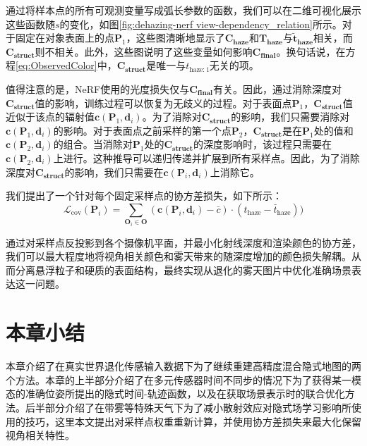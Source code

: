 通过将样本点的所有可观测变量写成弧长参数的函数，我们可以在二维可视化展示这些函数随$s$的变化，如图\ref{fig:dehazing-nerf view-dependency_relation}所示。对于固定在对象表面上的点$\mathbf{P}_1$，这些图清晰地显示了$\mathbf{C_\text{haze}}$和$\mathbf{T_\text{haze}}$与$\mathbf{\tilde{t}_\text{haze}}$相关，而$\mathbf{C_\text{struct}}$则不相关。此外，这些图说明了这些变量如何影响$\mathbf{C_\text{final}}$。换句话说，在方程\ref{eq:ObservedColor}中，$\mathbf{C_\text{struct}}$是唯一与${t}_\text{haze: i}$无关的项。

值得注意的是，NeRF使用的光度损失仅与$\mathbf{C_\text{final}}$有关。因此，通过消除深度对$\mathbf{C_\text{struct}}$值的影响，训练过程可以恢复为无歧义的过程。对于表面点$\mathbf{P}_1$，$\mathbf{C_\text{struct}}$值近似于该点的辐射值$\mathbf{c}(\mathbf{P}_1, \mathbf{d}_i)$。为了消除对$\mathbf{C_\text{struct}}$的影响，我们只需要消除对$\mathbf{c}(\mathbf{P}_1, \mathbf{d}_i)$的影响。对于表面点之前采样的第一个点$\mathbf{P}_2$，$\mathbf{C_\text{struct}}$是在$\mathbf{P}_1$处的值和$\mathbf{c}(\mathbf{P}_2, \mathbf{d}_i)$的组合。当消除对$\mathbf{P}_1$处的$\mathbf{C_\text{struct}}$的深度影响时，该过程只需要在$\mathbf{c}(\mathbf{P}_2, \mathbf{d}_i)$上进行。这种推导可以递归传递并扩展到所有采样点。因此，为了消除深度对$\mathbf{C_\text{struct}}$的影响，我们只需要在$\mathbf{c}(\mathbf{P}_i, \mathbf{d}_i)$上消除它。

我们提出了一个针对每个固定采样点的协方差损失，如下所示：
\begin{equation}
    \mathcal L_\text{cov}(\mathbf{P}_i) = \sum_{\mathbf{O}_i \in \mathbf{O}}(\mathbf{c}(\mathbf{P}_i, \mathbf{d}_i)-\bar{c})\cdot ({t}_\text{haze} - {\bar{t}}_\text{haze}))
\end{equation}

通过对采样点反投影到各个摄像机平面，并最小化射线深度和渲染颜色的协方差，我们可以最大程度地将视角相关颜色和雾天带来的随深度增加的颜色损失解耦。从而分离悬浮粒子和硬质的表面结构，最终实现从退化的雾天图片中优化准确场景表达这一问题。

\section{本章小结}
本章介绍了在真实世界退化传感输入数据下为了继续重建高精度混合隐式地图的两个方法。本章的上半部分介绍了在多元传感器时间不同步的情况下为了获得某一模态的准确位姿所提出的隐式时间-轨迹函数，以及在获取场景表示时的联合优化方法。后半部分介绍了在带雾等特殊天气下为了减小散射效应对隐式场学习影响所使用的技巧，这里本文提出对采样点权重重新计算，并使用协方差损失来最大化保留视角相关特性。